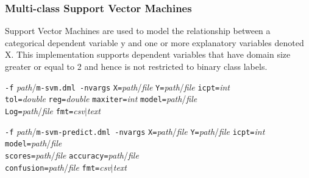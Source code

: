 \begin{comment}

 Licensed to the Apache Software Foundation (ASF) under one
 or more contributor license agreements.  See the NOTICE file
 distributed with this work for additional information
 regarding copyright ownership.  The ASF licenses this file
 to you under the Apache License, Version 2.0 (the
 "License"); you may not use this file except in compliance
 with the License.  You may obtain a copy of the License at

   http://www.apache.org/licenses/LICENSE-2.0

 Unless required by applicable law or agreed to in writing,
 software distributed under the License is distributed on an
 "AS IS" BASIS, WITHOUT WARRANTIES OR CONDITIONS OF ANY
 KIND, either express or implied.  See the License for the
 specific language governing permissions and limitations
 under the License.

\end{comment}

\subsubsection{Multi-class Support Vector Machines}
\label{msvm}


Support Vector Machines are used to model the relationship between a categorical 
dependent variable y and one or more explanatory variables denoted X. This 
implementation supports dependent variables that have domain size greater or
equal to 2 and hence is not restricted to binary class labels.
\\


\begin{tabbing}
\texttt{-f} \textit{path}/\texttt{m-svm.dml -nvargs}
\=\texttt{X=}\textit{path}/\textit{file} 
  \texttt{Y=}\textit{path}/\textit{file}
  \texttt{icpt=}\textit{int}\\
\>\texttt{tol=}\textit{double} 
  \texttt{reg=}\textit{double}
  \texttt{maxiter=}\textit{int} 
  \texttt{model=}\textit{path}/\textit{file}\\
\>\texttt{Log=}\textit{path}/\textit{file}
  \texttt{fmt=}\textit{csv}$\vert$\textit{text}
\end{tabbing}

\begin{tabbing}
\texttt{-f} \textit{path}/\texttt{m-svm-predict.dml -nvargs}
\=\texttt{X=}\textit{path}/\textit{file} 
  \texttt{Y=}\textit{path}/\textit{file}
  \texttt{icpt=}\textit{int}
  \texttt{model=}\textit{path}/\textit{file}\\
\>\texttt{scores=}\textit{path}/\textit{file}
  \texttt{accuracy=}\textit{path}/\textit{file}\\
\>\texttt{confusion=}\textit{path}/\textit{file}
  \texttt{fmt=}\textit{csv}$\vert$\textit{text}
\end{tabbing}


